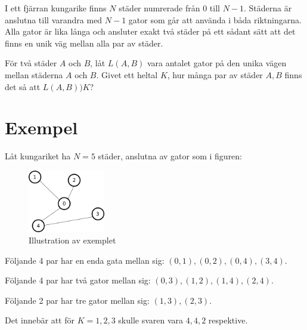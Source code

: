\newcommand\version{v2}
I ett fjärran kungarike finns $N$ städer numrerade från $0$ till $N-1$.
Städerna är anslutna till varandra med $N-1$ gator som går att använda i båda riktningarna.
Alla gator är lika långa och ansluter exakt två städer på ett sådant sätt att det finns en unik väg mellan alla par av städer.

För två städer $A$ och $B$, låt $L(A, B)$ vara antalet gator på den unika vägen mellan städerna $A$ och $B$. 
Givet ett heltal $K$, hur många par av städer $A, B$ finns det så att $L(A, B) ) K$?

\section*{Exempel}
Låt kungariket ha $N = 5$ städer, anslutna av gator som i figuren:
\begin{figure}[h!]
  \centering
  \includegraphics[width=0.3\textwidth]{sample.png}
  \caption{Illustration av exemplet}
\end{figure}

Följande 4 par har en enda gata mellan sig: $(0, 1), (0, 2), (0, 4), (3, 4)$.

Följande 4 par har två gator mellan sig: $(0, 3), (1, 2), (1, 4), (2, 4)$.

Följande 2 par har tre gator mellan sig: $(1, 3), (2, 3)$.

Det innebär att för $K = 1, 2, 3$ skulle svaren vara $4, 4, 2$ respektive.

